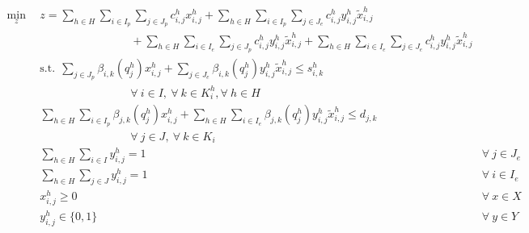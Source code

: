 \begin{subequations}\label{eqs:GFCTP-E}
  \begin{align}
    \label{eq:GRCTP-E_obj}
    \min_{z} \:\: 
    & 
    z = \sum_{h \in H}\sum_{i \in I_{p}}\sum_{j \in J_{p}}c_{i,j}^{h} x_{i,j}^{h} 
    + \sum_{h \in H}\sum_{i \in I_{p}}\sum_{j \in J_{e}}c_{i,j}^{h} y_{i,j}^{h} \tilde{x}_{i,j}^{h} \nonumber \\
    & 
    \qquad\qquad\qquad\qquad
    + \sum_{h \in H}\sum_{i \in I_{e}}\sum_{j \in J_{p}}c_{i,j}^{h} y_{i,j}^{h} \tilde{x}_{i,j}^{h}
    + \sum_{h \in H}\sum_{i \in I_{e}}\sum_{j \in J_{e}}c_{i,j}^{h} y_{i,j}^{h} \tilde{x}_{i,j}^{h}
    && \\
    \label{eq:GRCTP-E_sup}
    &
    \text{s.t.} \:\: 
    \sum_{j \in J_{p}}\beta_{i,k}(q_{j}^{h}) x_{i,j}^{h}
    + \sum_{j \in J_{e}}\beta_{i,k}(q_{j}^{h}) y_{i,j}^{h} \tilde{x}_{i, j}^{h} \leq s_{i,k}^{h} \nonumber \\
    &
    \qquad\qquad\qquad\qquad
    \forall \: i \in I, \: \forall \: k \in K_{i}^{h}, \forall \: {h \in H}\\
    \label{eq:GRCTP-E_dem}
    &
    \sum_{h \in H}\sum_{i \in I_{p}}\beta_{j,k}(q_{j}^{h}) x_{i,j}^{h}
    + \sum_{h \in H}\sum_{i \in I_{e}}\beta_{j,k}(q_{j}^{h}) y_{i,j}^{h} \tilde{x}_{i, j}^{h} \leq d_{j,k} \nonumber \\
    &
    \qquad\qquad\qquad\qquad
    \forall \: j \in J, \: \forall \: k \in K_{i}\\
    \label{eq:GRCTP-E_sumy_j}
    &
    \sum_{h \in H}\sum_{i \in I} y_{i,j}^{h} = 1
    &
    \forall \: j \in J_{e}  &\\
    \label{eq:GRCTP-E_sumy_i}
    &
    \sum_{h \in H}\sum_{j \in J} y_{i,j}^{h} = 1
    &
    \forall \: i \in I_{e}  &\\
    \label{eq:GRCTP-E_x}
    &
    x_{i,j}^{h} \geq 0
    &
    \forall \: x \in X  &\\
    \label{eq:GRCTP-E_y}
    &
    y_{i,j}^{h} \in \{0,1\}
    &
    \forall \: y \in Y &
  \end{align}
\end{subequations}
